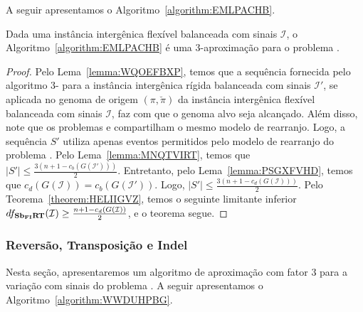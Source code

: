 A seguir apresentamos o Algoritmo~\ref{algorithm:EMLPACHB}.



\begin{theorem}\label{theorem:QISZKAHW}
Dada uma instância intergênica flexível balanceada com sinais $\mathcal{I}$, o Algoritmo~\ref{algorithm:EMLPACHB} é uma $3$-aproximação para o problema \SbFIRT{}.
\end{theorem}
\begin{proof}
Pelo Lema~\ref{lemma:WQOEFBXP}, temos que a sequência fornecida pelo algoritmo $3$-\SbIRT{} para a instância intergênica rígida balanceada com sinais $\mathcal{I'}$, se aplicada no genoma de origem $(\pi,\breve\pi)$ da instância intergênica flexível balanceada com sinais $\mathcal{I}$, faz com que o genoma alvo seja alcançado. Além disso, note que os problemas \SbIRT{} e \SbFIRT{} compartilham o mesmo modelo de rearranjo. Logo, a sequência $S'$ utiliza apenas eventos permitidos pelo modelo de rearranjo do problema \SbFIRT{}. Pelo Lema~\ref{lemma:MNQTVIRT}, temos que $|S'| \le \frac{3({n+1} - c_b(G(\mathcal{I}')))}{2}$. Entretanto, pelo Lema~\ref{lemma:PSGXFVHD}, temos que $c_d(G(\mathcal{I})) = c_b(G(\mathcal{I}'))$. Logo, $|S'| \le \frac{3({n+1} - c_d(G(\mathcal{I})))}{2}$. Pelo Teorema~\ref{theorem:HELIIGVZ}, temos o seguinte limitante inferior $df_{\textbf{Sb\textsubscript{FI}RT}}(\mathcal{I}) \ge \frac{{n+1} - c_d(G(\mathcal{I}))}{2}$, e o teorema segue.
\end{proof}

\subsubsection{Reversão, Transposição e Indel}

Nesta seção, apresentaremos um algoritmo de aproximação com fator $3$ para a variação com sinais do problema \SbFIRTI{}. A seguir apresentamos o Algoritmo~\ref{algorithm:WWDUHPBG}.




